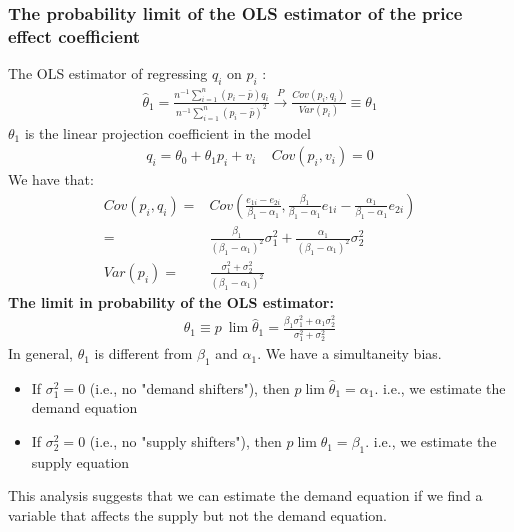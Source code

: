 \documentclass[a4paper,twoside,11pt]{article}
\begin{document}
\subsubsection{The probability limit of the OLS estimator of the price effect coefficient}
The OLS estimator of regressing $q_i$ on $p_i$ :
\begin{equation*}
\begin{aligned}
\hat{\theta}_1 = \frac{n^{-1}\sum^n_{i=1}(p_i - \bar p)q_i}{n^{-1}\sum^n_{i=1}(p_i - \bar p)^2} \overset{P}{\rightarrow} \frac{Cov(p_i,q_i)}{Var(p_i)} \equiv \theta_1
\end{aligned} 
\end{equation*}
$\theta_1$ is the linear projection coefficient in the model
\begin{equation*}
\begin{aligned}
q_i = \theta_0 + \theta_1 p_i + v_i \ \ \ \ \ Cov(p_i, v_i)=0
\end{aligned} 
\end{equation*}
We have that:
\begin{equation*}
\begin{aligned}
Cov(p_i,q_i) =& Cov(\frac{e_{1i}-e_{2i}}{\beta_1 - \alpha_1}, \frac{\beta_1}{\beta_1 - \alpha_1}e_{1i} - \frac{\alpha_1}{\beta_1 - \alpha_1} e_{2i}) \\
=& \frac{\beta_1}{(\beta_1 - \alpha_1)^2} \sigma_1^2 + \frac{\alpha_1}{(\beta_1 - \alpha_1)^2} \sigma_2^2 \\
Var(p_i) =& \frac{\sigma_1^2 + \sigma_2^2}{(\beta_1 - \alpha_1)^2}
\end{aligned} 
\end{equation*}
\textbf{The limit in probability of the OLS estimator:}
\begin{equation*}
\begin{aligned}
\theta_1 \equiv p \ \lim \hat{\theta}_1 = \frac{\beta_1 \sigma_1^2 + \alpha_1 \sigma_2^2}{\sigma_1^2 + \sigma_2^2}
\end{aligned} 
\end{equation*}
In general, $\theta_1$ is different from $\beta_1$ and $\alpha_1$. We have a simultaneity bias.
\begin{itemize}
    \item If $\sigma_1^2 =0$ (i.e., no "demand shifters"), then $p \lim \hat{\theta}_1 = \alpha_1$. i.e., we estimate the demand equation
    \item If $\sigma_2^2 =0$ (i.e., no "supply shifters"), then $p \lim \hat{\theta}_1 = \beta_1$. i.e., we estimate the supply equation
\end{itemize}
This analysis suggests that we can estimate the demand equation if we find a variable that affects the supply but not the demand equation.
\end{document}
